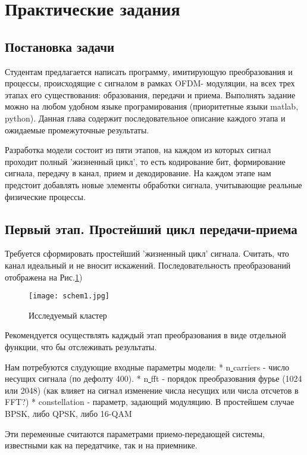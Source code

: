 \documentclass[a4paper,12pt]{article}
\begin{document}
\section{Практические задания}
\subsection*{Постановка задачи}
     Студентам предлагается написать программу, имитирующую преобразования и процессы, происходящие с сигналом в рамках OFDM- модуляции, на всех трех этапах его существования: образования, передачи и приема.
     Выполнять задание можно на любом удобном языке програмирования (приоритетные языки matlab, python). 
     Данная глава содержит последовательное описание каждого этапа и ожидаемые промежуточные результаты.
    

Разработка модели состоит из пяти этапов, на каждом из которых сигнал проходит полный 'жизненный цикл', то есть кодирование бит, формирование сигнала, передачу в канал, прием и декодирование.  
На каждом этапе нам предстоит добавлять новые элементы обработки сигнала, учитывающие реальные физические процессы. 

\subsection{Первый этап. Простейший цикл передачи-приема}
Требуется сформировать простейший 'жизненный цикл' сигнала.
Считать, что канал идеальный и не вносит искажений.
Последовательность преобразований отображена на Рис.\ref{fg:schem1}) 
\begin{figure}[h!]
\centering
\texttt{[image: schem1.jpg]}
\caption{Исследуемый кластер} \label{fg:schem1}
\end{figure}

Рекомендуется осуществлять кадждый этап преобразования в виде отдельной функции, что бы отслеживать результаты. 

Нам потребуются слудующие входные параметры модели:
* n\underline{ }carriers - число несущих сигнала (по дефолту 400).  %
* n\underline{ }fft - порядок преобразования фурье (1024 или 2048) (как влияет на сигнал изменение числа несущих или числа отсчетов в FFT?)%
* constellation - параметр, задающий модуляцию. В простейшем случае BPSK, либо QPSK, либо 16-QAM %

Эти переменные считаются параметрами приемо-передающей системы,  известными как на передатчике, так и на приемнике.
\end{document}
